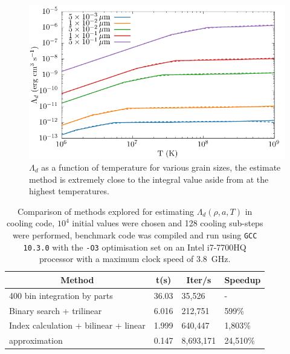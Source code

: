 \begin{figure}
  \centering
  \includegraphics{assets/grain-transparency/lambda-comp.pdf}
  \caption[Electron transparency method accuracy - $\Lambda_d$]{$\Lambda_d$ as a function of temperature for various grain sizes, the estimate method is extremely close to the integral value aside from at the highest temperatures.}
  \label{fig:lambda-comp-int-vs-est}
\end{figure}

\begin{table}
  \centering
  \begin{tabular}{llll}
    \hline
    \multicolumn{1}{c}{\textbf{Method}} & \multicolumn{1}{c}{\textbf{t(s)}} & \multicolumn{1}{c}{\textbf{Iter/s}} & \multicolumn{1}{c}{\textbf{Speedup}} \\ \hline
    400 bin integration by parts & 36.03 & 35,526 & - \\
    Binary search + trilinear & 6.016 & 212,751 & 599\% \\
    Index calculation + bilinear + linear & 1.999 & 640,447 & 1,803\% \\
    \cite{dwek_infrared_1981} approximation & 0.147 & 8,693,171 & 24,510\% \\ \hline
  \end{tabular}
  \caption[Dust cooling calculation comparison]{Comparison of methods explored for estimating $\Lambda_d(\rho,a,T)$ in cooling code, $10^4$ initial values were chosen and 128 cooling sub-steps were performed, benchmark code was compiled and run using \texttt{GCC 10.3.0} with the \texttt{-O3} optimisation set on an Intel i7-7700HQ processor with a maximum clock speed of \SI{3.8}{\giga\hertz}.}
  \label{tab:electron-speedup}
\end{table}

